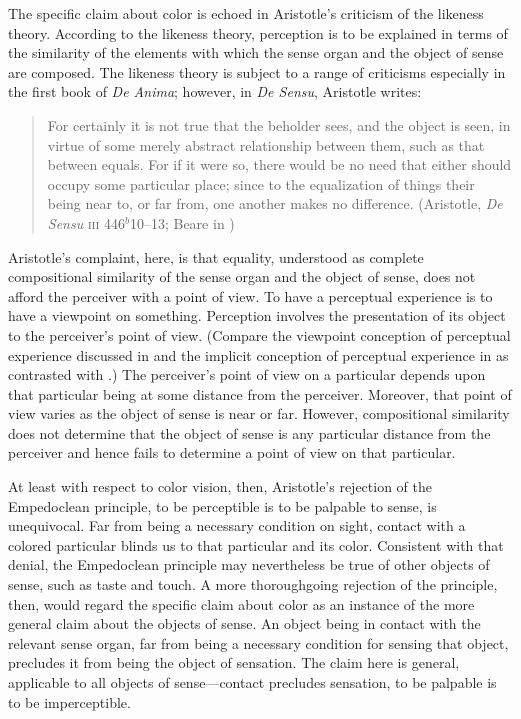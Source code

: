 The specific claim about color is echoed in Aristotle's criticism of the likeness theory. According to the likeness theory, perception is to be explained in terms of the similarity of the elements with which the sense organ and the object of sense are composed. The likeness theory is subject to a range of criticisms especially in the first book of \emph{De Anima}; however, in \emph{De Sensu}, Aristotle writes:
\begin{quote}
	For certainly it is not true that the beholder sees, and the object is seen, in virtue of some merely abstract relationship between them, such as that between equals. For if it were so, there would be no need that either should occupy some particular place; since to the equalization of things their being near to, or far from, one another makes no difference. (Aristotle, \emph{De Sensu} \textsc{iii} 446\( ^{b} \)10--13; Beare in \citealt[20]{Barnes:1984uq})
\end{quote}
Aristotle's complaint, here, is that equality, understood as complete compositional similarity of the sense organ and the object of sense, does not afford the perceiver with a point of view. To have a perceptual experience is to have a viewpoint on something. Perception involves the presentation of its object to the perceiver's point of view. (Compare the viewpoint conception of perceptual experience discussed in \citealt{Martin:1998nx} and the implicit conception of perceptual experience in \citealt{Nagel:1979fk} as contrasted with \citealt{Jackson:1982my}.) The perceiver's point of view on a particular depends upon that particular being at some distance from the perceiver. Moreover, that point of view varies as the object of sense is near or far. However, compositional similarity does not determine that the object of sense is any particular distance from the perceiver and hence fails to determine a point of view on that particular.

At least with respect to color vision, then, Aristotle's rejection of the Empedoclean principle, to be perceptible is to be palpable to sense, is unequivocal. Far from being a necessary condition on sight, contact with a colored particular blinds us to that particular and its color. Consistent with that denial, the Empedoclean principle may nevertheless be true of other objects of sense, such as taste and touch. A more thoroughgoing rejection of the principle, then, would regard the specific claim about color as an instance of the more general claim about the objects of sense. An object being in contact with the relevant sense organ, far from being a necessary condition for sensing that object, precludes it from being the object of sensation. The claim here is general, applicable to all objects of sense---contact precludes sensation, to be palpable is to be imperceptible.

